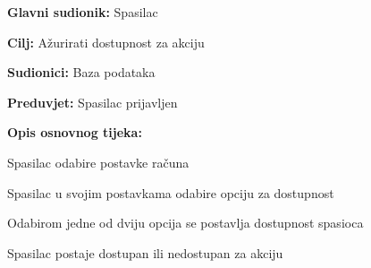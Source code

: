 					\noindent {}
					\begin{packed_item}
	
						\item \textbf{Glavni sudionik: }\text Spasilac
						\item  \textbf{Cilj:} \text Ažurirati dostupnost za akciju
						\item  \textbf{Sudionici:} \text Baza podataka
						\item  \textbf{Preduvjet:} \text Spasilac prijavljen
						\item  \textbf{Opis osnovnog tijeka:}
						
						\item[] \begin{packed_enum}
							
							\item \text Spasilac odabire postavke računa
							\item \text Spasilac u svojim postavkama odabire opciju za dostupnost
							\item \text Odabirom jedne od dviju opcija se postavlja dostupnost spasioca
							\item \text Spasilac postaje dostupan ili nedostupan za akciju
						\end{packed_enum}
					\end{packed_item}

